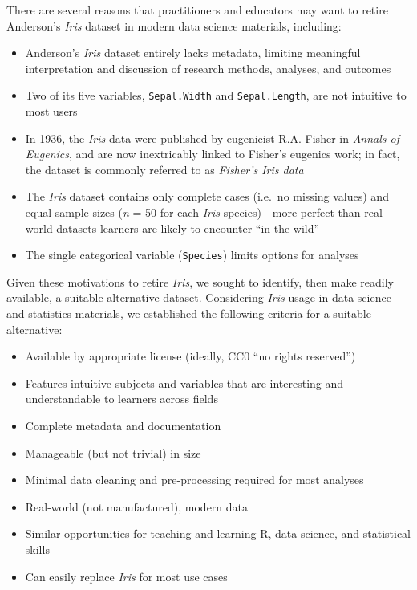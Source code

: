 There are several reasons that practitioners and educators may want to
retire Anderson's \emph{Iris} dataset in modern data science materials,
including:

\begin{itemize}
\tightlist
\item
  Anderson's \emph{Iris} dataset entirely lacks metadata, limiting
  meaningful interpretation and discussion of research methods,
  analyses, and outcomes
\item
  Two of its five variables, \texttt{Sepal.Width} and
  \texttt{Sepal.Length}, are not intuitive to most users
\item
  In 1936, the \emph{Iris} data were published by eugenicist R.A. Fisher
  in \emph{Annals of Eugenics}, and are now inextricably linked to
  Fisher's eugenics work; in fact, the dataset is commonly referred to
  as \emph{Fisher's Iris data}
\item
  The \emph{Iris} dataset contains only complete cases (i.e.~no missing
  values) and equal sample sizes (\emph{n} = 50 for each \emph{Iris}
  species) - more perfect than real-world datasets learners are likely
  to encounter ``in the wild''
\item
  The single categorical variable (\texttt{Species}) limits options for
  analyses
\end{itemize}

Given these motivations to retire \emph{Iris}, we sought to identify,
then make readily available, a suitable alternative dataset. Considering
\emph{Iris} usage in data science and statistics materials, we
established the following criteria for a suitable alternative:

\begin{itemize}
\tightlist
\item
  Available by appropriate license (ideally, CC0 ``no rights reserved'')
\item
  Features intuitive subjects and variables that are interesting and
  understandable to learners across fields
\item
  Complete metadata and documentation
\item
  Manageable (but not trivial) in size
\item
  Minimal data cleaning and pre-processing required for most analyses
\item
  Real-world (not manufactured), modern data
\item
  Similar opportunities for teaching and learning R, data science, and
  statistical skills
\item
  Can easily replace \emph{Iris} for most use cases
\end{itemize}

